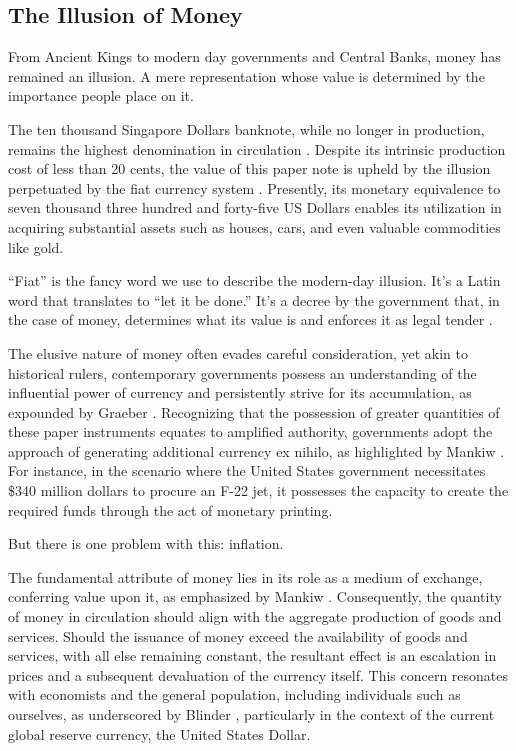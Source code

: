 \subsection{The Illusion of Money}
From Ancient Kings to modern day governments and Central Banks, money has remained an illusion. A mere representation whose value is determined
by the importance people place on it.

The ten thousand Singapore Dollars banknote, while no longer in production, remains the highest denomination in circulation \cite{goodhart1998}.
Despite its intrinsic production cost of less than 20 cents, the value of this paper note is upheld by the illusion perpetuated by the fiat
currency system \cite{gupta2019}. Presently, its monetary equivalence to seven thousand three hundred and forty-five US Dollars enables its
utilization in acquiring substantial assets such as houses, cars, and even valuable commodities like gold.

“Fiat” is the fancy word we use to describe the modern-day illusion. It's a Latin word that translates to “let it be done.” It's a decree by
the government that, in the case of money, determines what its value is and enforces it as legal tender \cite{reinhart2018, friedman2000}.

The elusive nature of money often evades careful consideration, yet akin to historical rulers, contemporary governments possess an understanding
of the influential power of currency and persistently strive for its accumulation, as expounded by Graeber \cite{graeber2011}. Recognizing that
the possession of greater quantities of these paper instruments equates to amplified authority, governments adopt the approach of generating
additional currency ex nihilo, as highlighted by Mankiw \cite{mankiw2014}. For instance, in the scenario where the United States government
necessitates \$340 million dollars to procure an F-22 jet, it possesses the capacity to create the required funds through the act of monetary
printing.

But there is one problem with this: inflation.

The fundamental attribute of money lies in its role as a medium of exchange, conferring value upon it, as emphasized by Mankiw \cite{mankiw2014}.
Consequently, the quantity of money in circulation should align with the aggregate production of goods and services. Should the issuance of
money exceed the availability of goods and services, with all else remaining constant, the resultant effect is an escalation in prices and a
subsequent devaluation of the currency itself. This concern resonates with economists and the general population, including individuals such as
ourselves, as underscored by Blinder \cite{blinder2010}, particularly in the context of the current global reserve currency, the United States
Dollar.

